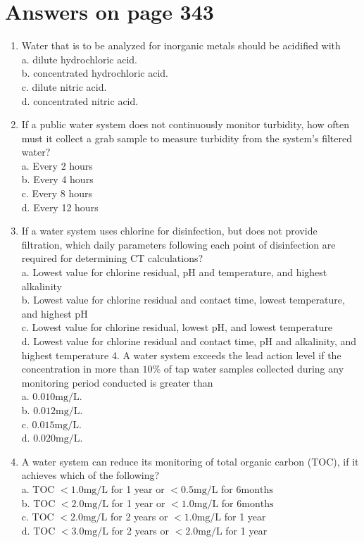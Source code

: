 \documentclass[10pt]{article}
\begin{document}
\section{Answers on page 343}
\begin{enumerate}
  \item Water that is to be analyzed for inorganic metals should be acidified with\\
a. dilute hydrochloric acid.\\
b. concentrated hydrochloric acid.\\
c. dilute nitric acid.\\
d. concentrated nitric acid.

  \item If a public water system does not continuously monitor turbidity, how often must it collect a grab sample to measure turbidity from the system's filtered water?\\
a. Every 2 hours\\
b. Every 4 hours\\
c. Every 8 hours\\
d. Every 12 hours

  \item If a water system uses chlorine for disinfection, but does not provide filtration, which daily parameters following each point of disinfection are required for determining CT calculations?\\
a. Lowest value for chlorine residual, pH and temperature, and highest alkalinity\\
b. Lowest value for chlorine residual and contact time, lowest temperature, and highest $\mathrm{pH}$\\
c. Lowest value for chlorine residual, lowest $\mathrm{pH}$, and lowest temperature\\
d. Lowest value for chlorine residual and contact time, $\mathrm{pH}$ and alkalinity, and highest temperature 4. A water system exceeds the lead action level if the concentration in more than $10 \%$ of tap water samples collected during any monitoring period conducted is greater than\\
a. $0.010 \mathrm{mg} / \mathrm{L}$.\\
b. $0.012 \mathrm{mg} / \mathrm{L}$.\\
c. $0.015 \mathrm{mg} / \mathrm{L}$.\\
d. $0.020 \mathrm{mg} / \mathrm{L}$.

  \item A water system can reduce its monitoring of total organic carbon (TOC), if it achieves which of the following?\\
a. TOC $<1.0 \mathrm{mg} / \mathrm{L}$ for 1 year or $<0.5 \mathrm{mg} / \mathrm{L}$ for $6 \mathrm{months}$\\
b. TOC $<2.0 \mathrm{mg} / \mathrm{L}$ for 1 year or $<1.0 \mathrm{mg} / \mathrm{L}$ for $6 \mathrm{months}$\\
c. TOC $<2.0 \mathrm{mg} / \mathrm{L}$ for 2 years or $<1.0 \mathrm{mg} / \mathrm{L}$ for 1 year\\
d. TOC $<3.0 \mathrm{mg} / \mathrm{L}$ for 2 years or $<2.0 \mathrm{mg} / \mathrm{L}$ for 1 year

\end{enumerate}
\end{document}
